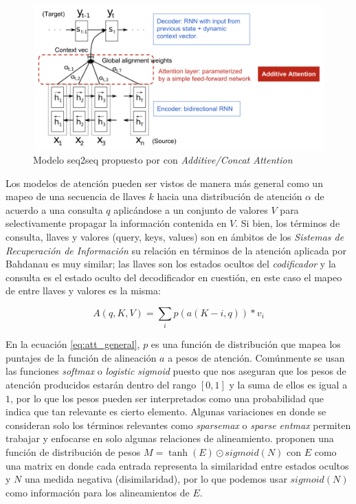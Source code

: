 \begin{figure}[ht!]
    \centering
    \includegraphics[width=0.8 \textwidth]{Chapters/2. Transformer/Figures/rnn/attention.png}
    \caption{Modelo seq2seq propuesto por \citeauthor{bahdanau2016neural} con \textit{Additive/Concat Attention}}
    \label{fig:att}
\end{figure}

Los modelos de atención pueden ser vistos de manera más general como un mapeo de una secuencia de
llaves $k$ hacia una distribución de atención $\alpha$ de acuerdo a una consulta $q$ aplicándose a un
conjunto de valores $V$ para selectivamente propagar la información contenida en $V$.
Si bien, los términos de consulta, llaves y valores (query, keys, values)
son en ámbitos de los \textit{Sistemas de Recuperación de Información} su relación en términos de
la atención aplicada por Bahdanau es muy similar; las llaves son los estados ocultos del \textit{codificador}
y la consulta es el estado oculto del decodificador en cuestión, en este caso el mapeo de entre llaves
y valores es la misma:

\begin{equation}
    A(q, K, V) = \sum_i p(a(K-i, q)) * v_i
    \label{eq:att_general}
\end{equation}

En la ecuación \ref{eq:att_general}, $p$ es una función de distribución que mapea los puntajes de la
función de alineación $a$ a pesos de atención. Comúnmente se usan las funciones \textit{softmax} o
\textit{logistic sigmoid} puesto que nos aseguran que los pesos de atención producidos estarán dentro
del rango $[0,1]$ y la suma de ellos es igual a $1$, por lo que los pesos pueden ser interpretados como
una probabilidad que indica que tan relevante es cierto elemento. Algunas variaciones en donde se
consideran solo los términos relevantes como \textit{sparsemax} \citeauthor{DBLP:journals/corr/MartinsA16}
o \textit{sparse entmax} \citeauthor{DBLP:journals/corr/abs-2006-07214} permiten trabajar y enfocarse
en solo algunas relaciones de alineamiento. \citeauthor{NEURIPS2019_16fc18d7} proponen una función de
distribución de pesos $M = \tanh(E) \odot sigmoid(N)$ con $E$ como una matrix en donde cada entrada
representa la similaridad entre estados ocultos y $N$ una medida negativa (disimilaridad), por lo que
podemos usar
$sigmoid(N)$ como información para  los alineamientos de $E$.

